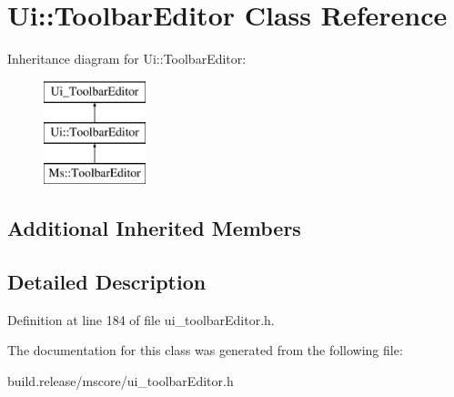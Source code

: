 \hypertarget{class_ui_1_1_toolbar_editor}{}\section{Ui\+:\+:Toolbar\+Editor Class Reference}
\label{class_ui_1_1_toolbar_editor}
Inheritance diagram for Ui\+:\+:Toolbar\+Editor\+:\begin{figure}[H]
\begin{center}
\leavevmode
\includegraphics[height=3.000000cm]{class_ui_1_1_toolbar_editor}
\end{center}
\end{figure}
\subsection*{Additional Inherited Members}


\subsection{Detailed Description}


Definition at line 184 of file ui\+\_\+toolbar\+Editor.\+h.



The documentation for this class was generated from the following file\+:\begin{DoxyCompactItemize}
\item 
build.\+release/mscore/ui\+\_\+toolbar\+Editor.\+h\end{DoxyCompactItemize}

